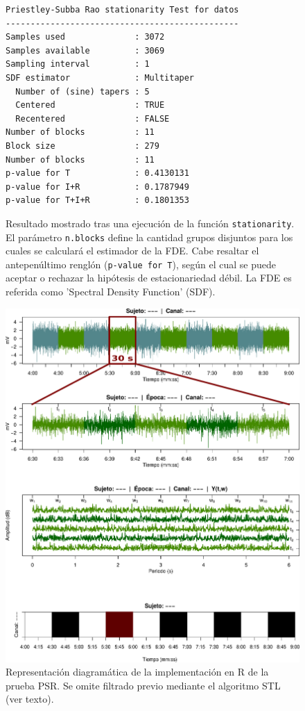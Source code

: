 \begin{figure}
\centering
\begin{lstlisting}[caption={}]
Priestley-Subba Rao stationarity Test for datos
-----------------------------------------------
Samples used              : 3072 
Samples available         : 3069 
Sampling interval         : 1 
SDF estimator             : Multitaper 
  Number of (sine) tapers : 5 
  Centered                : TRUE 
  Recentered              : FALSE 
Number of blocks          : 11 
Block size                : 279 
Number of blocks          : 11 
p-value for T             : 0.4130131 
p-value for I+R           : 0.1787949 
p-value for T+I+R         : 0.1801353 
\end{lstlisting}
\caption{Resultado mostrado tras una ejecuci\'on de la funci\'on \texttt{stationarity}.
El par\'ametro \texttt{n.blocks} define la cantidad grupos disjuntos para los cuales se 
calcular\'a el estimador de la FDE.
Cabe resaltar el antepen\'ultimo rengl\'on (\texttt{p-value for T}), seg\'un el cual se puede
aceptar o rechazar la hip\'otesis de estacionariedad d\'ebil.
La FDE es referida como 'Spectral Density Function' (SDF).}
\label{res_psr}
\end{figure}

\begin{figure}
\centering
\includegraphics[width=0.7\linewidth]{./img_diagramas/psr_simple.pdf}
\caption{Representaci\'on diagram\'atica de la implementaci\'on en R de la prueba PSR. Se omite 
filtrado previo mediante el algoritmo STL (ver texto).}
\label{diagrama_psr}
\end{figure}

